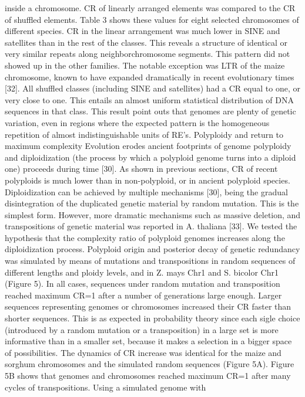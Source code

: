 inside a chromosome. CR of linearly arranged elements was compared to the CR of shuffled
elements. Table 3 shows these values for eight selected chromosomes of different species. CR
in the linear arrangement was much lower in SINE and satellites than in the rest of the
classes. This reveals a structure of identical or very similar repeats along neighborchromosome segments. This pattern did not showed up in the other families. The notable
exception was LTR of the maize chromosome, known to have expanded dramatically in
recent evolutionary times [32]. All shuffled classes (including SINE and satellites) had a CR
equal to one, or very close to one. This entails an almost uniform statistical distribution of
DNA sequences in that class. This result point outs that genomes are plenty of genetic
variation, even in regions where the expected pattern is the homogeneous repetition of almost
indistinguishable units of RE's.
Polyploidy and return to maximum complexity
Evolution erodes ancient footprints of genome polyploidy and diploidization (the process by
which a polyploid genome turns into a diploid one) proceeds during time [30]. As shown in
previous sections, CR of recent polyploids is much lower than in non-polyploid, or in ancient
polyploid species. Diploidization can be achieved by multiple mechanisms [30], being the
gradual disintegration of the duplicated genetic material by random mutation. This is the
simplest form. However, more dramatic mechanisms such as massive deletion, and
transpositions of genetic material was reported in A. thaliana [33]. We tested the hypothesis
that the complexity ratio of polyploid genomes increases along the diploidization process.
Polyploid origin and posterior decay of genetic redundancy was simulated by means of
mutations and transpositions in random sequences of different lengths and ploidy levels, and
in Z. mays Chr1 and S. bicolor Chr1 (Figure 5). In all cases, sequences under random
mutation and transposition reached maximum CR=1 after a number of generations large
enough. Larger sequences representing genomes or chromosomes increased their CR faster
than shorter sequences. This is as expected in probability theory since each sigle choice
(introduced by a random mutation or a transposition) in a large set is more informative than
in a smaller set, because it makes a selection in a bigger space of possibilities. The dynamics
of CR increase was identical for the maize and sorghum chromosomes and the simulated
random sequences (Figure 5A). Figure 5B shows that genomes and chromosomes reached
maximum CR=1 after many cycles of transpositions. Using a simulated genome with
